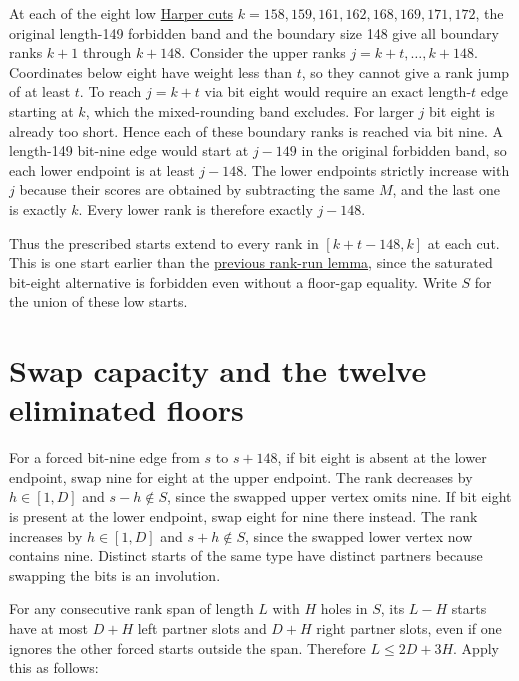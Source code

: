 \documentclass[11pt,letterpaper]{article}
\begin{document}
At each of the eight low \href{../README.md}{Harper cuts}
\(k=158,159,161,162,168,169,171,172\), the original length-149 forbidden
band and the boundary size 148 give all boundary ranks \(k+1\) through
\(k+148\). Consider the upper ranks \(j=k+t,\ldots,k+148\). Coordinates
below eight have weight less than \(t\), so they cannot give a rank jump
of at least \(t\). To reach \(j=k+t\) via bit eight would require an
exact length-\(t\) edge starting at \(k\), which the mixed-rounding band
excludes. For larger \(j\) bit eight is already too short. Hence each of
these boundary ranks is reached via bit nine. A length-149 bit-nine edge
would start at \(j-149\) in the original forbidden band, so each lower
endpoint is at least \(j-148\). The lower endpoints strictly increase
with \(j\) because their scores are obtained by subtracting the same
\(M\), and the last one is exactly \(k\). Every lower rank is therefore
exactly \(j-148\).

Thus the prescribed starts extend to every rank in \([k+t-148,k]\) at
each cut. This is one start earlier than the
\href{../hall-rank-runs/}{previous rank-run lemma}, since the saturated
bit-eight alternative is forbidden even without a floor-gap equality.
Write \(S\) for the union of these low starts.

\section{Swap capacity and the twelve eliminated
floors}\label{swap-capacity-and-the-twelve-eliminated-floors}

For a forced bit-nine edge from \(s\) to \(s+148\), if bit eight is
absent at the lower endpoint, swap nine for eight at the upper endpoint.
The rank decreases by \(h\in[1,D]\) and \(s-h\notin S\), since the
swapped upper vertex omits nine. If bit eight is present at the lower
endpoint, swap eight for nine there instead. The rank increases by
\(h\in[1,D]\) and \(s+h\notin S\), since the swapped lower vertex now
contains nine. Distinct starts of the same type have distinct partners
because swapping the bits is an involution.

For any consecutive rank span of length \(L\) with \(H\) holes in \(S\),
its \(L-H\) starts have at most \(D+H\) left partner slots and \(D+H\)
right partner slots, even if one ignores the other forced starts outside
the span. Therefore \(L\le2D+3H\). Apply this as follows:
\end{document}
